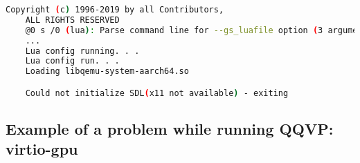 \small
\begin{lstlisting}[language=bash]
    Copyright (c) 1996-2019 by all Contributors,
    ALL RIGHTS RESERVED
    @0 s /0 (lua): Parse command line for --gs_luafile option (3 arguments)
    ...
    Lua config running. . .
    Lua config run. . .
    Loading libqemu-system-aarch64.so

    Could not initialize SDL(x11 not available) - exiting
\end{lstlisting}
\normalsize

\subsection{Example of a problem while running QQVP: virtio-gpu}
\label{sec:virtioGPU}

